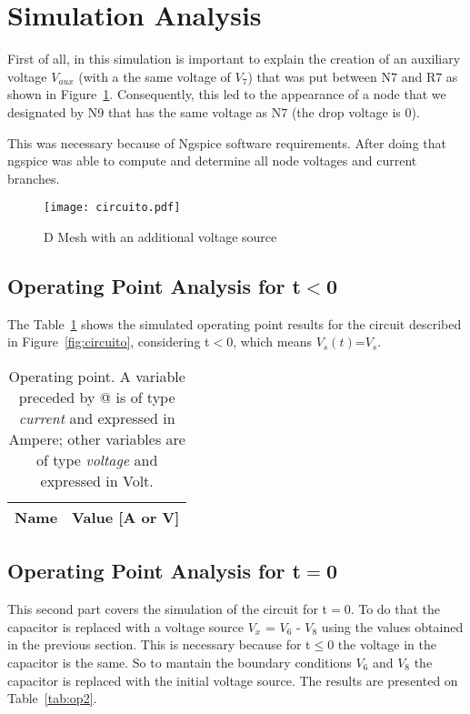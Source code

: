 \section{Simulation Analysis}

\label{sec:simulation}
First of all, in this simulation is important to explain the creation of an auxiliary voltage $V_{aux}$ (with a the same voltage of $V_{7}$) that was put between N7 and R7 as shown in Figure~\ref{fig:malhaD}. Consequently, this led to the appearance of a node that we designated by N9 that has the same voltage as N7 (the drop voltage is 0). 

This was necessary because of Ngspice software requirements. After doing that ngspice was able to compute and determine all node voltages and current branches.

\begin{figure}[!ht] \centering
\texttt{[image: circuito.pdf]}
\caption{D Mesh with an additional voltage source} 
\label{fig:malhaD}
\end{figure}


\subsection{Operating Point Analysis for t$<$0}

The Table~\ref{tab:op1} shows the simulated operating point results for the circuit described in Figure~\ref{fig:circuito}, considering t$<$0, which means $V_{s}(t)$=$V_{s}$.

\begin{table}[!ht]
  \centering
  \begin{tabular}{|l|r|}
    \hline    
    {\bf Name} & {\bf Value [A or V]} \\ \hline
    
  \end{tabular}
  \caption{Operating point. A variable preceded by @ is of type {\em current}
    and expressed in Ampere; other variables are of type {\it voltage} and expressed in
    Volt.}
  \label{tab:op1}
\end{table}

\subsection{Operating Point Analysis for t$=$0}

This second part covers the simulation of the circuit for t$=$0. To do that the capacitor is replaced with a voltage source $V_{x}$ = $V_{6}$ - $V_{8}$ using the values obtained in the previous section. This is necessary because for t$\leq$0 the voltage in the capacitor is the same. So to mantain the boundary conditions $V_{6}$ and $V_{8}$ the capacitor is replaced with the initial voltage source.
The results are presented on Table~\ref{tab:op2}.
\newline
\newline

